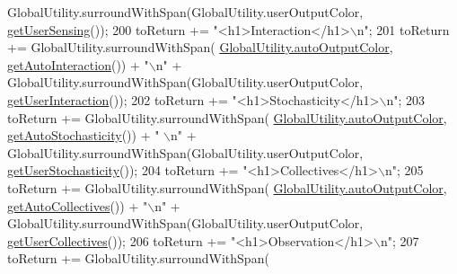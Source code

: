 \begin{DoxyCode}
      GlobalUtility.surroundWithSpan(GlobalUtility.userOutputColor, \hyperlink{classit_1_1isislab_1_1masonassisteddocumentation_1_1_o_d_d_1_1_design_concepts_a88879fab32ae73d1c0e38d74470da904}{getUserSensing}());
200             toReturn += \textcolor{stringliteral}{"<h1>Interaction</h1>\(\backslash\)n"};
201             toReturn += GlobalUtility.surroundWithSpan(
      \hyperlink{classit_1_1isislab_1_1masonassisteddocumentation_1_1mason_1_1analizer_1_1_global_utility_a2e086c8a2d8edf16b2eaf90408832adc}{GlobalUtility.autoOutputColor}, \hyperlink{classit_1_1isislab_1_1masonassisteddocumentation_1_1_o_d_d_1_1_design_concepts_a6a53f6937a281e824c4abdbf46667434}{getAutoInteraction}()) + \textcolor{stringliteral}{"\(\backslash\)n"} 
      + GlobalUtility.surroundWithSpan(GlobalUtility.userOutputColor, 
      \hyperlink{classit_1_1isislab_1_1masonassisteddocumentation_1_1_o_d_d_1_1_design_concepts_a78abd615ef6f33bba7928831ce756173}{getUserInteraction}());
202             toReturn += \textcolor{stringliteral}{"<h1>Stochasticity</h1>\(\backslash\)n"};
203             toReturn += GlobalUtility.surroundWithSpan(
      \hyperlink{classit_1_1isislab_1_1masonassisteddocumentation_1_1mason_1_1analizer_1_1_global_utility_a2e086c8a2d8edf16b2eaf90408832adc}{GlobalUtility.autoOutputColor}, \hyperlink{classit_1_1isislab_1_1masonassisteddocumentation_1_1_o_d_d_1_1_design_concepts_af6a55be66dfc758a957239c2b2b0de0b}{getAutoStochasticity}()) + \textcolor{stringliteral}{"
      \(\backslash\)n"} + GlobalUtility.surroundWithSpan(GlobalUtility.userOutputColor, 
      \hyperlink{classit_1_1isislab_1_1masonassisteddocumentation_1_1_o_d_d_1_1_design_concepts_a0ad00303b2c1b5b5658be4c1233c0537}{getUserStochasticity}());
204             toReturn += \textcolor{stringliteral}{"<h1>Collectives</h1>\(\backslash\)n"};
205             toReturn += GlobalUtility.surroundWithSpan(
      \hyperlink{classit_1_1isislab_1_1masonassisteddocumentation_1_1mason_1_1analizer_1_1_global_utility_a2e086c8a2d8edf16b2eaf90408832adc}{GlobalUtility.autoOutputColor}, \hyperlink{classit_1_1isislab_1_1masonassisteddocumentation_1_1_o_d_d_1_1_design_concepts_ace96ca25fa05fd7a0ab815d051ed90b9}{getAutoCollectives}()) + \textcolor{stringliteral}{"\(\backslash\)n"} 
      + GlobalUtility.surroundWithSpan(GlobalUtility.userOutputColor, 
      \hyperlink{classit_1_1isislab_1_1masonassisteddocumentation_1_1_o_d_d_1_1_design_concepts_a508566b6e3ba02f79c3fc1702575546d}{getUserCollectives}());
206             toReturn += \textcolor{stringliteral}{"<h1>Observation</h1>\(\backslash\)n"};
207             toReturn += GlobalUtility.surroundWithSpan(

\end{DoxyCode}
